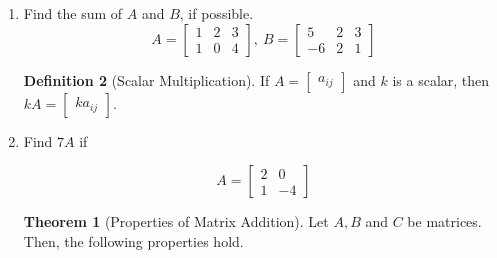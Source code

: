 \documentclass[12pt]{amsart}
\theoremstyle{definition}
\newtheorem*{definition}{Definition}
\newtheorem{theorem}{Theorem}
\begin{document}
\begin{enumerate}[itemsep=0.8em,leftmargin=0pt]
\begin{definition}[Addition of Matrices]\label{def:additionofmatrices}
Let $A=\begin{bmatrix} a_{ij}\end{bmatrix} $ and $B=\begin{bmatrix} b_{ij}\end{bmatrix}$ be two
$m\times n$ matrices. Then the \textbf{sum of matrices} $A$ and $B$, denoted by $A+B$,  is an $m \times n$
matrix  given by 
$$A+B=\begin{bmatrix}a_{ij}+b_{ij}\end{bmatrix}$$

\end{definition}


\item Find the sum of $A$ and $B$, if possible.
\begin{equation*}
A = \begin{bmatrix}
1 & 2 & 3 \\
1 & 0 & 4
\end{bmatrix}, ~
B = \begin{bmatrix}
5 & 2 & 3 \\
-6 & 2 & 1
\end{bmatrix}
\end{equation*}

\vspace{0.8em}

\begin{definition}[Scalar Multiplication]\label{def:scalarmultofmatrices}
If $A=\begin{bmatrix} a_{ij}\end{bmatrix} $ and $k$ is a scalar,
then $kA=\begin{bmatrix} ka_{ij}\end{bmatrix}$. 
\end{definition}


\item Find $7A$ if

$$A=\begin{bmatrix}
2 & 0 \\
1 & -4
\end{bmatrix}$$

\vspace{0.8em}

\begin{theorem}[Properties of Matrix Addition]\label{th:propertiesofaddition}
Let $A,B$ and $C$ be matrices. Then, the following properties  hold. 


\end{theorem}
\end{enumerate}
\end{document}
